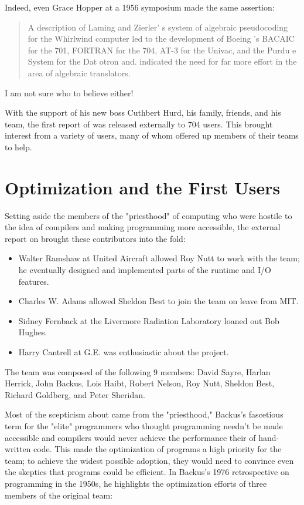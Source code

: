 Indeed, even Grace Hopper at a 1956 symposium made the same assertion:

\begin{quotation}
    A description of Laming and Zierler' s system of algebraic pseudocoding for 
the Whirlwind computer led to the development of Boeing 's BACAIC for the 701, 
FORTRAN for the 704, AT-3 for the Univac, and the Purdu e System for the Dat 
otron and. indicated the need for far more effort in the area of algebraic 
translators.
\cite{Knuth_TrabbPardo_1976_Early_Development}
\end{quotation}

I am not sure who to believe either!

With the support of his new boss Cuthbert Hurd, his family, friends, and his team,
the first report of \FTN{} was released externally to 704 users.
This brought interest from a variety of users, many of whom offered up members
of their teams to help.

\section{\FTN{} Optimization and the First Users}

Setting aside the members of the "priesthood" of computing who were hostile to the
idea of compilers and making programming more accessible, the external report on \FTN{}
brought these contributors into the fold:
\begin{itemize}
    \item Walter Ramshaw at United Aircraft allowed Roy Nutt to work with the team;
            he eventually designed and implemented parts of the runtime and I/O features.
    \item Charles W. Adams allowed Sheldon Best to join the team on leave from MIT.
    \item Sidney Fernback at the Livermore Radiation Laboratory loaned out Bob Hughes.
    \item Harry Cantrell at G.E. was enthusiastic about the project.
\end{itemize}

The team was composed of the following 9 members: 
David Sayre, Harlan Herrick, John Backus, 
Lois Haibt, Robert Nelson, Roy Nutt, 
Sheldon Best, Richard Goldberg, and Peter Sheridan.

Most of the scepticism about \FTN{} came from the "priesthood," Backus's fascetious term
for the "elite" programmers who thought programming needn't be made accessible 
and compilers would never achieve the performance their of hand-written code.
This made the optimization of \FTN{} programs a high priority for the team; to achieve
the widest possible adoption, they would need to convince even the skeptics that
\FTN{} programs could be efficient.
In Backus's 1976 retrospective on programming in the 1950s\cite{Backus_1980_Programming_in_America_in_1950s},
he highlights the optimization efforts of three members of the original team:

